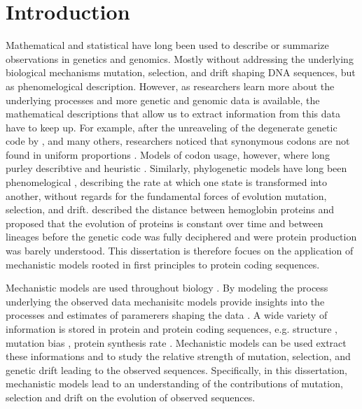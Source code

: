 \chapter{Introduction} 
\label{ch:introduction}

Mathematical and statistical have long been used to describe or summarize observations in genetics and genomics.
Mostly without addressing the underlying biological mechanisms mutation, selection, and drift shaping DNA sequences, but as phenomelogical description.
However, as researchers learn more about the underlying processes and more genetic and genomic data is available, the mathematical descriptions that allow us to extract information from this data have to keep up.
For example, after the unreaveling of the degenerate genetic code by \citet{MatthaeiAndNirenberg1961,NirenbergAndMatthaei1961,Maxwell1962,LederAndNirenberg1964}, and many others, researchers noticed that synonymous codons are not found in uniform proportions \citep{fitch1976,grantham1980,ikemura1981,grantham1981,sharp1988}.
Models of codon usage, however, where long purley describtive and heuristic \citep{ikemura1981,BennetzenAndHall1982,sharp1987,wright1990}.
Similarly, phylogenetic models have long been phenomelogical \citep{JukesAndCantor1969,Dayhoff1978,Kimura1980,felsenstein1981,Altschul1991}, describing the rate at which one state is transformed into another, without regards for the fundamental forces of evolution mutation, selection, and drift.
\citet{ZuckerkandlAndPauling1962} described the distance between hemoglobin proteins and proposed that the evolution of proteins is constant over time and between lineages before the genetic code was fully deciphered and were protein production was barely understood.
This dissertation is therefore focues on the application of mechanistic models rooted in first principles to protein coding sequences.

Mechanistic models are used throughout biology \citep{GoldmanAndYang1994,loreau1998,DavisAndPelsor2001,adf2007,McGill2007}.
By modeling the process underlying the observed data mechanisitc models provide insights into the processes and estimates of paramerers shaping the data \citep{Liberles2013}.
A wide variety of information is stored in protein and protein coding sequences, e.g. structure \citep{anfinsen1973}, mutation bias \citep{ShahAndGilchrist2011, gilchrist2015}, protein synthesis rate \citep{gilchrist2007,gilchrist2015}. 
Mechanistic models can be used extract these informations and to study the relative strength of mutation, selection, and genetic drift leading to the observed sequences.
Specifically, in this dissertation, mechanistic models lead to an understanding of the contributions of mutation, selection and drift on the evolution of observed sequences.

